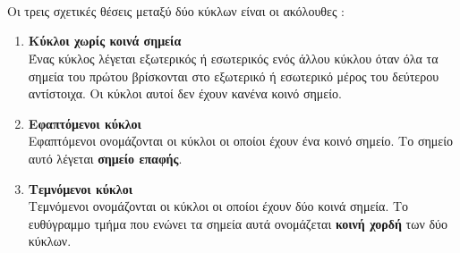\documentclass[twoside,nofonts,ektypwsh,shmeiwseis]{thewria}
\begin{document}
\mbox{}\\\\\\
Οι τρεις σχετικές θέσεις μεταξύ δύο κύκλων είναι οι ακόλουθες :
\begin{enumerate}[itemsep=0mm,label=\bf\arabic*.]
\item \textbf{Κύκλοι χωρίς κοινά σημεία}\\
Ένας κύκλος λέγεται εξωτερικός ή εσωτερικός ενός άλλου κύκλου όταν όλα τα σημεία του πρώτου βρίσκονται στο εξωτερικό ή εσωτερικό μέρος του δεύτερου αντίστοιχα. Οι κύκλοι αυτοί δεν έχουν κανένα κοινό σημείο.
\item \textbf{Εφαπτόμενοι κύκλοι}\\
Εφαπτόμενοι ονομάζονται οι κύκλοι οι οποίοι έχουν ένα κοινό σημείο. Το σημείο αυτό λέγεται \textbf{σημείο επαφής}.
\item \textbf{Τεμνόμενοι κύκλοι}\\
Τεμνόμενοι ονομάζονται οι κύκλοι οι οποίοι έχουν δύο κοινά σημεία. Το ευθύγραμμο τμήμα που ενώνει τα σημεία αυτά ονομάζεται \textbf{κοινή χορδή} των δύο κύκλων.
\end{enumerate}
\end{document}

